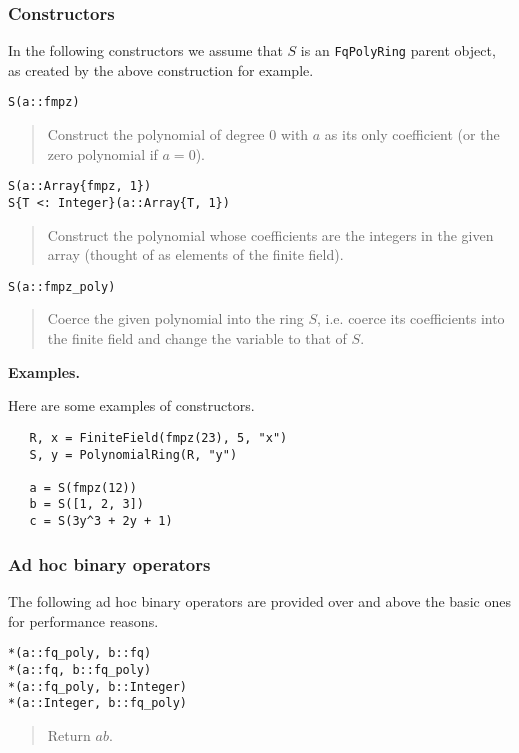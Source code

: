 \documentclass[a4paper,10pt]{article}
\newcommand{\code}{\lstinline}
\newcommand{\desc}[1]{\vspace{-3mm}\begin{quote}#1\end{quote}}
\begin{document}
{{\subsubsection{Constructors}

In the following constructors we assume that $S$ is an \code{FqPolyRing} parent 
object, as created by the above construction for example.

\begin{lstlisting}
S(a::fmpz)
\end{lstlisting}

\desc{Construct the polynomial of degree $0$ with $a$ as its only coefficient (or
the zero polynomial if $a = 0$).}

\begin{lstlisting}
S(a::Array{fmpz, 1})
S{T <: Integer}(a::Array{T, 1})
\end{lstlisting}

\desc{Construct the polynomial whose coefficients are the integers in the given
array (thought of as elements of the finite field).}

\begin{lstlisting}
S(a::fmpz_poly)
\end{lstlisting}

\desc{Coerce the given polynomial into the ring $S$, i.e. coerce its coefficients
into the finite field and change the variable to that of $S$.}

\textbf{Examples.}

Here are some examples of constructors.

\begin{lstlisting}
   R, x = FiniteField(fmpz(23), 5, "x")
   S, y = PolynomialRing(R, "y")

   a = S(fmpz(12))
   b = S([1, 2, 3])
   c = S(3y^3 + 2y + 1)
\end{lstlisting}

\subsubsection{Ad hoc binary operators}

The following ad hoc binary operators are provided over and above the basic ones
for performance reasons.

\begin{lstlisting}
*(a::fq_poly, b::fq)
*(a::fq, b::fq_poly)
*(a::fq_poly, b::Integer)
*(a::Integer, b::fq_poly)
\end{lstlisting}

\desc{Return $ab$.}

}}
\end{document}
